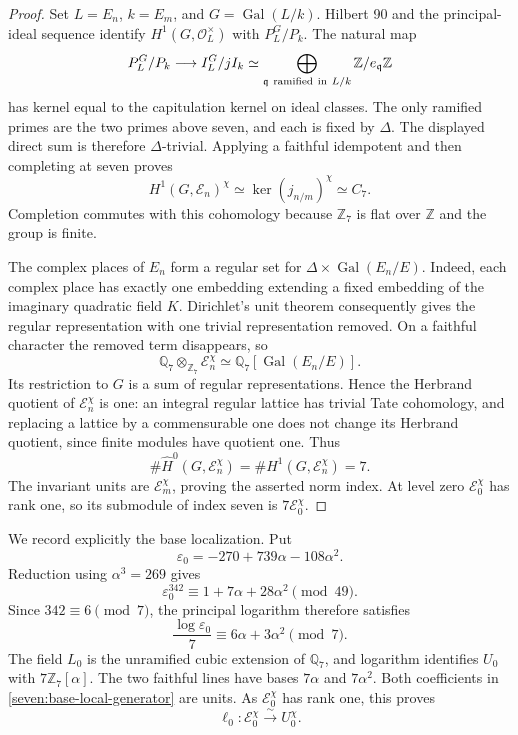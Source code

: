 \documentclass[11pt]{article}
\begin{document}
\begin{proof}
Set $L=E_n$, $k=E_m$, and $G=\operatorname{Gal}(L/k)$. Hilbert 90 and
the principal-ideal sequence identify
$H^1(G,\mathcal O_L^\times)$ with $P_L^G/P_k$.
The natural map
\[
 P_L^G/P_k\longrightarrow I_L^G/jI_k
 \simeq
 \bigoplus_{\mathfrak q\ {\rm ramified\ in}\ L/k}
           \mathbb Z/e_{\mathfrak q}\mathbb Z
\]
has kernel equal to the capitulation kernel on ideal classes.
The only ramified primes are the two primes above seven, and each is
fixed by $\Delta$. The displayed direct sum is therefore
$\Delta$-trivial. Applying a faithful idempotent and then completing
at seven proves
\[
 H^1(G,\mathcal E_n)^\chi
 \simeq\ker(j_{n/m})^\chi\simeq C_7.
\]
Completion commutes with this cohomology because $\mathbb Z_7$ is flat
over $\mathbb Z$ and the group is finite.

The complex places of $E_n$ form a regular set for
$\Delta\times\operatorname{Gal}(E_n/E)$. Indeed, each complex place has
exactly one embedding extending a fixed embedding of the imaginary
quadratic field $K$. Dirichlet's unit theorem consequently gives the
regular representation with one trivial representation removed.
On a faithful character the removed term disappears, so
\[
 \mathbb Q_7\otimes_{\mathbb Z_7}\mathcal E_n^\chi
 \simeq
 \mathbb Q_7[\operatorname{Gal}(E_n/E)].
\]
Its restriction to $G$ is a sum of regular representations. Hence the
Herbrand quotient of $\mathcal E_n^\chi$ is one: an integral regular
lattice has trivial Tate cohomology, and replacing a lattice by a
commensurable one does not change its Herbrand quotient, since finite
modules have quotient one. Thus
\[
 \#\widehat H^0(G,\mathcal E_n^\chi)
 =\#H^1(G,\mathcal E_n^\chi)=7.
\]
The invariant units are $\mathcal E_m^\chi$, proving the asserted
norm index. At level zero $\mathcal E_0^\chi$ has rank one, so its
submodule of index seven is $7\mathcal E_0^\chi$.
\end{proof}

We record explicitly the base localization. Put
\[
 \varepsilon_0=-270+739\alpha-108\alpha^2.
\]
Reduction using $\alpha^3=269$ gives
\[
 \varepsilon_0^{342}
 \equiv1+7\alpha+28\alpha^2\pmod{49}.
\]
Since $342\equiv6\pmod7$, the principal logarithm therefore satisfies
\begin{equation*}\tag{U4}\label{seven:base-local-generator}
 \frac{\log\varepsilon_0}{7}
 \equiv6\alpha+3\alpha^2\pmod7.
\end{equation*}
The field $L_0$ is the unramified cubic extension of $\mathbb Q_7$,
and logarithm identifies $U_0$ with $7\mathbb Z_7[\alpha]$.
The two faithful lines have bases $7\alpha$ and $7\alpha^2$.
Both coefficients in \eqref{seven:base-local-generator} are units.
As $\mathcal E_0^\chi$ has rank one, this proves
\begin{equation*}\tag{U5}\label{seven:base-local-isomorphism}
 \ell_0:\mathcal E_0^\chi\xrightarrow{\ \sim\ }U_0^\chi.
\end{equation*}
\end{document}
